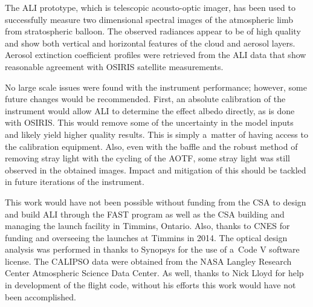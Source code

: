 \documentclass[amtd, online, hvmath]{copernicus}
\begin{document}
\conclusions

The ALI prototype, which is telescopic acousto-optic imager, has been
used to successfully measure two dimensional spectral images of the
atmospheric limb from stratospheric balloon. The observed radiances
appear to be of high quality and show both vertical and horizontal
features of the cloud and aerosol layers. Aerosol extinction
coefficient profiles were retrieved from the ALI data that show
reasonable agreement with OSIRIS satellite measurements.

No large scale issues were found with the instrument performance;
however, some future changes would be recommended. First, an absolute
calibration of the instrument would allow ALI to determine the effect
albedo directly, as is done with OSIRIS. This would remove some of the
uncertainty in the model inputs and likely yield higher quality
results. This is simply a~matter of having access to the calibration
equipment. Also, even with the baffle and the robust method of
removing stray light with the cycling of the AOTF, some stray light
was still observed in the obtained images. Impact and mitigation of
this should be tackled in future iterations of the instrument.

\begin{acknowledgements}
  This work would have not been possible without funding from the CSA
  to design and build ALI through the FAST program as well as the CSA
  building and managing the launch facility in Timmins, Ontario. Also,
  thanks to CNES for funding and overseeing the launches at Timmins in
  2014. The optical design analysis was performed in thanks to
  Synopsys for the use of a~Code V software license. The CALIPSO data
  were obtained from the NASA Langley Research Center Atmospheric
  Science Data Center. As well, thanks to Nick Lloyd for help in
  development of the flight code, without his efforts this work would
  have not been accomplished.
\end{acknowledgements}
\end{document}
